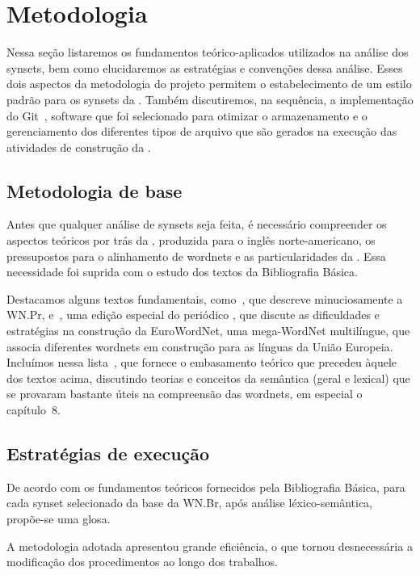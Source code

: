 \chapter{Metodologia}

Nessa seção listaremos os fundamentos teórico-aplicados utilizados na análise
dos synsets, bem como elucidaremos as estratégias e convenções dessa análise.
Esses dois aspectos da metodologia do projeto permitem o estabelecimento de um
estilo padrão para os synsets da \wnbr. Também discutiremos, na sequência, a
implementação do Git~\cite{git}, software que foi selecionado para otimizar o
armazenamento e o gerenciamento dos diferentes tipos de arquivo que são gerados
na execução das atividades de construção da \wnbr.

\section{Metodologia de base}

Antes que qualquer análise de synsets seja feita, é necessário compreender os
aspectos teóricos por trás da \wnpr, produzida para o inglês norte-americano,
os pressupostos para o alinhamento de wordnets e as particularidades da \wnbr.
Essa necessidade foi suprida com o estudo dos textos da Bibliografia Básica.

Destacamos alguns textos fundamentais, como~, que descreve
minuciosamente a WN.Pr, e~, uma edição especial do periódico
, que discute as dificuldades e
estratégias na construção da EuroWordNet, uma mega-WordNet multilíngue, que
associa diferentes wordnets em construção para as línguas da União Europeia.
Incluímos nessa lista~, que fornece o embasamento teórico
que precedeu àquele dos textos acima, discutindo teorias e conceitos da
semântica (geral e lexical) que se provaram bastante úteis na compreensão das
wordnets, em especial o capítulo~8.

\section{Estratégias de execução}

De acordo com os fundamentos teóricos fornecidos pela Bibliografia Básica, para
cada synset selecionado da base da WN.Br, após análise léxico-semântica,
propõe-se uma glosa.

A metodologia adotada apresentou grande eficiência, o que tornou desnecessária a
modificação dos procedimentos ao longo dos trabalhos.

